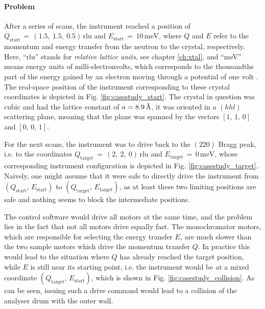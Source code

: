 \paragraph{Problem}
After a series of scans, the instrument reached a position of 
$Q_\mathrm{start}\,=\,\left(1.5,\ 1.5,\ 0.5\right)\, \mathrm{rlu}$ and  $E_\mathrm{start}\,=\,10\, \mathrm{meV}$, where
$Q$ and $E$ refer to the momentum and energy transfer from the neutron to the crystal, respectively.
Here, ``rlu'' stands for \textit{relative lattice units}, see chapter \ref{ch:xtal}, and ``meV'' means energy units of milli-electronvolts,
which corresponds to the thousandths part of the energy gained by an electron moving through a potential of one volt \cite{wiki_eV}.
The real-space position of the instrument corresponding to these crystal coordinates is depicted in Fig. \ref{fig:casestudy_start}.
The crystal in question was cubic and had the lattice constant of $a = 8.9\,\textup{\AA}$, it was
oriented in a $(hhl)$ scattering plane, meaning that the plane was spanned by the vectors
$\left[1,\, 1,\, 0\right]$ and $\left[0,\, 0,\, 1\right]$.

For the next scans, the instrument was to drive back to the $\left(220\right)$ Bragg peak, 
i.e. to the coordinates $Q_\mathrm{target}\,=\,\left(2,\ 2,\ 0\right)\, \mathrm{rlu}$ and  $E_\mathrm{target}\,=\,0\, \mathrm{meV}$,
whose corresponding instrument configuration is depicted in Fig. \ref{fig:casestudy_target}.
Naively, one might assume that it were safe to directly drive the instrument from $\left(Q_\mathrm{start},\, E_\mathrm{start}\right)$
to $\left(Q_\mathrm{target},\, E_\mathrm{target}\right)$, as at least these two limiting positions are safe and nothing seems to block
the intermediate positions.

The control software would drive all motors at the same time, and the problem lies in the fact that not all motors
drive equally fast. The monochromator motors, which are responsible for selecting the energy transfer $E$, are
much slower than the two sample motors which drive the momentum transfer $Q$. In practice this would lead to
the situation where $Q$ has already reached the target position, while $E$ is still near its starting point, i.e. the instrument
would be at a mixed coordinate $\left(Q_\mathrm{target},\, E_\mathrm{start}\right)$,
which is shown in Fig. \ref{fig:casestudy_collision}.
As can be seen, issuing such a drive command would lead to a collision of the analyser drum with the outer wall.


